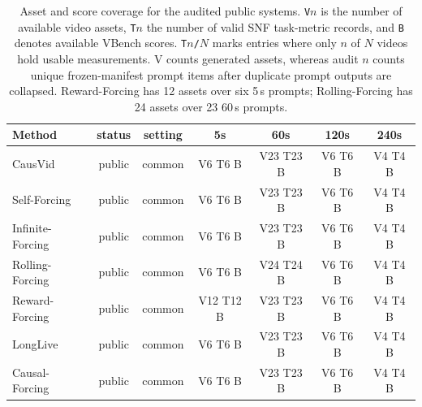 \begin{table}[!htbp]
\centering
\scriptsize
\setlength{\tabcolsep}{5pt}
\begin{tabular}{lcccccc}
\toprule
Method & status & setting & 5s & 60s & 120s & 240s \\
\midrule
CausVid & public & common & V6 T6 B & V23 T23 B & V6 T6 B & V4 T4 B \\
Self-Forcing & public & common & V6 T6 B & V23 T23 B & V6 T6 B & V4 T4 B \\
Infinite-Forcing & public & common & V6 T6 B & V23 T23 B & V6 T6 B & V4 T4 B \\
Rolling-Forcing & public & common & V6 T6 B & V24 T24 B & V6 T6 B & V4 T4 B \\
Reward-Forcing & public & common & V12 T12 B & V23 T23 B & V6 T6 B & V4 T4 B \\
LongLive & public & common & V6 T6 B & V23 T23 B & V6 T6 B & V4 T4 B \\
Causal-Forcing & public & common & V6 T6 B & V23 T23 B & V6 T6 B & V4 T4 B \\
\bottomrule
\end{tabular}
\caption{Asset and score coverage for the audited public systems. \texttt{V$n$} is the number of available video assets, \texttt{T$n$} the number of valid SNF task-metric records, and \texttt{B} denotes available VBench scores. \texttt{T$n$/$N$} marks entries where only $n$ of $N$ videos hold usable measurements. V counts generated assets, whereas audit $n$ counts unique frozen-manifest prompt items after duplicate prompt outputs are collapsed. Reward-Forcing has 12 assets over six 5\,s prompts; Rolling-Forcing has 24 assets over 23 60\,s prompts.}
\label{tab:coverage}
\end{table}